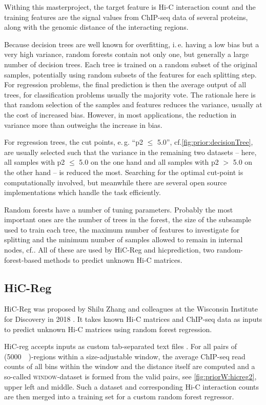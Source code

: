 Withing this masterproject, the target feature is Hi-C interaction count
and the training features are the signal values from ChIP-seq data of several proteins,
along with the genomic distance of the interacting regions.

Because decision trees are well known for overfitting, i.\,e. having a low bias but a very high variance,
random forests contain not only one, but generally a large number of decision trees.
Each tree is trained on a random subset of the original samples, potentially using random subsets
of the features for each splitting step.
For regression problems, the final prediction is then the average output of all trees, 
for classification problems usually the majority vote.
The rationale here is that random selection of the samples and features reduces the variance,
usually at the cost of increased bias. 
However, in most applications, the reduction in variance more than outweighs the increase in bias.

For regression trees, the cut points, e.\,g. ``p2 $\leq$ 5.0'', cf.\;\autoref{fig:prior:decisionTree}, 
are usually selected such that the variance in the remaining two datasets -- here, 
all samples with p2 $\leq$ 5.0 on the one hand and all samples with p2 $>$ 5.0 on
the other hand -- is reduced the most.
Searching for the optimal cut-point is computationally involved,
but meanwhile there are several open source implementations which handle the task efficiently.

Random forests have a number of tuning parameters. 
Probably the most important ones are the number of trees in the forest, 
the size of the subsample used to train each tree,
the maximum number of features to investigate for splitting
and the minimum number of samples allowed to remain in internal nodes, cf.\;\cite{scikitEnsemble2019}.
All of these are used by HiC-Reg and hicprediction, two random-forest-based methods
to predict unknown Hi-C matrices.

\subsection{HiC-Reg}
HiC-Reg was proposed by Shilu Zhang and colleagues at the Wisconsin Institute for Discovery in 2018 \cite{Zhang2019, Zhang2018}.
It takes known Hi-C matrices and ChIP-seq data as inputs to predict unknown Hi-C matrices using random forest regression.

HiC-reg accepts inputs as custom tab-separated text files \cite{Roy2020}.
For all pairs of (\SI{5000}{\kilo\bp})-regions within a size-adjustable window, the average
ChIP-seq read counts of all bins within the window and the distance itself 
are computed and a so-called \textsc{window}-dataset is formed from the valid pairs, see \autoref{fig:priorW:hicreg2}, upper left and middle.
Such a dataset and corresponding Hi-C interaction counts are then merged into a training set
for a custom random forest regressor. 

